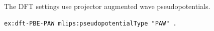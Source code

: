 The DFT settings use projector augmented wave pseudopotentials.
\begin{lstlisting}[language=turtle]
ex:dft-PBE-PAW mlips:pseudopotentialType "PAW" .
\end{lstlisting}
